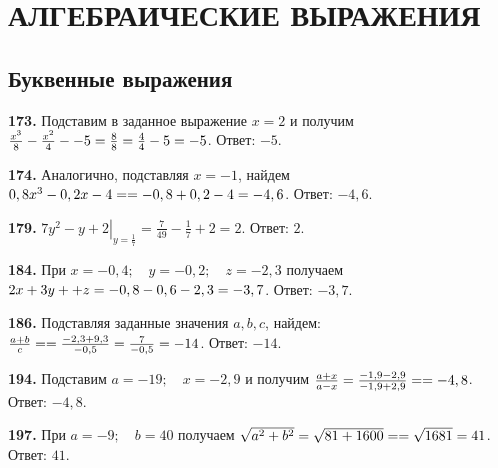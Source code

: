 \section{АЛГЕБРАИЧЕСКИЕ ВЫРАЖЕНИЯ}
\subsection{Буквенные выражения}


\textbf{173.} Подставим  в заданное выражение $x=2$ и получим $\frac{x^3}{8}-\frac{x^2}{4}-\linebreak-5=\frac{8}{8}=\frac{4}{4}-5=-5$. \newline \null \hspace*{\fill} Ответ: $-5$. 

\textbf{174.} Аналогично, подставляя $x=-1$, найдем $0,8x^3-0,2x-4=\linebreak=-0,8+0,2-4=-4,6$. \newline \null \hspace*{\fill} Ответ: $-4,6$. 

\textbf{179.} $\left.7y^2-y+2\right|_{y=\frac{1}{7}}=\frac{7}{49}-\frac{1}{7}+2=2$. \newline \null \hspace*{\fill} Ответ: $2$.

\textbf{184.} При $x=-0,4;\quad y=-0,2;\quad z=-2,3$ получаем $2x+3y+\linebreak+z=-0,8-0,6-2,3=-3,7$. \newline \null \hspace*{\fill} Ответ: $-3,7$.

\textbf{186.} Подставляя заданные значения $a, b,c$, найдем: $\frac{a+b}{c}=\linebreak= \frac{-2,3+9,3}{-0,5}= \frac{7}{-0,5}=-14$. \newline \null \hspace*{\fill} Ответ: $-14$. 

\textbf{194.} Подставим $a=-19;\quad x=-2,9$ и получим
$\frac{a+x}{a-x}=\frac{-1,9-2,9}{-1,9+2,9}=\linebreak=-4,8$. \newline \null \hspace*{\fill} Ответ: $-4,8$. 

\textbf{197.} При $a=-9;\quad b=40$ получаем $\sqrt{a^2+b^2}=\sqrt{81+1600}=\linebreak=\sqrt{1681}=41$.\newline \null \hspace*{\fill} Ответ: $41$. 

